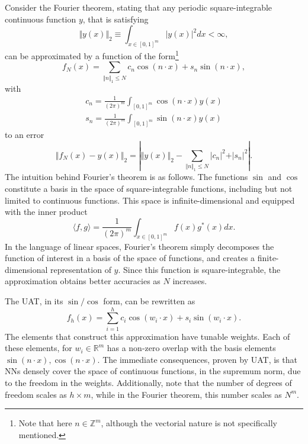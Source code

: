 \documentclass[]{report}
\begin{document}
Consider the Fourier theorem, stating that any periodic square-integrable continuous function $y$, that is satisfying
\begin{equation}
\Vert y(x) \Vert_2 \equiv \int_{x \in [0, 1]^m} \vert y(x) \vert^2 dx < \infty,
\end{equation}
can be approximated by a function of the form\footnote{Note that here $n \in \mathbb Z^m$, although the vectorial nature is not specifically mentioned. }
\begin{equation}
f_N(x) = \sum_{\Vert n \Vert_1 \leq N} c_{n} \cos(n \cdot x) + s_{n} \sin(n \cdot x), 
\end{equation}
with 
\begin{align}
c_n = \frac{1}{(2\pi)^m} \int_{[0, 1]^m} \cos(n \cdot x) y(x) \\
s_n = \frac{1}{(2\pi)^m} \int_{[0, 1]^m} \sin(n \cdot x) y(x)
\end{align}
to an error 
\begin{equation}
\Vert f_N(x) - y(x) \Vert_2 = \left \vert \Vert y(x) \Vert_2 - \sum_{\Vert n \Vert_1 \leq N} \vert c_n\vert^2 + \vert s_n\vert^2\right\vert.
\end{equation}
The intuition behind Fourier's theorem is as follows. The functions $\sin$ and $\cos$ constitute a basis in the space of square-integrable functions, including but not limited to continuous functions.  This space is infinite-dimensional and equipped with the inner product
\begin{equation}
\langle f, g \rangle = \frac{1}{(2\pi)^m} \int_{x \in [0,1]^m} f(x) g^*(x) dx .
\end{equation}
In the language of linear spaces, Fourier's theorem simply decomposes the function of interest in a basis of the space of functions, and creates a finite-dimensional representation of $y$. Since this function is square-integrable, the approximation obtains better accuracies as $N$ increases. 

The UAT, in its $\sin / \cos$ form, can be rewritten as 
\begin{equation}
f_h(x) = \sum_{i = 1}^h c_{i} \cos(w_i \cdot x) + s_{i} \sin(w_i \cdot x). 
\end{equation}
The elements that construct this approximation have tunable weights. Each of these elements, for $w_i \in \mathbb R^m$ has a non-zero overlap with the basis elements $\sin(n \cdot x), \cos(n \cdot x)$. The immediate consequences, proven by UAT, is that NNs densely cover the space of continuous functions, in the supremum norm, due to the freedom in the weights. Additionally, note that the number of degrees of freedom scales as $h \times m$, while in the Fourier theorem, this number scales as $N^m$.
\end{document}
